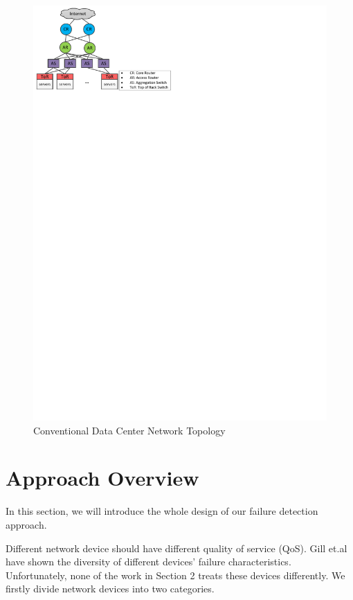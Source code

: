 \documentclass{sig-alternate-05-2015}
\begin{document}
\begin{figure}
\centering
\includegraphics{topology}
\caption{Conventional Data Center Network Topology}
\end{figure}


\section{Approach Overview}
In this section, we will introduce the whole design of our failure detection approach.

Different network device should have different quality of service (QoS). Gill et.al \cite{gill2011understanding} have shown the diversity of different devices' failure characteristics. Unfortunately, none of the work in Section 2 treats these devices differently. We firstly divide network devices into two categories.
\end{document}

